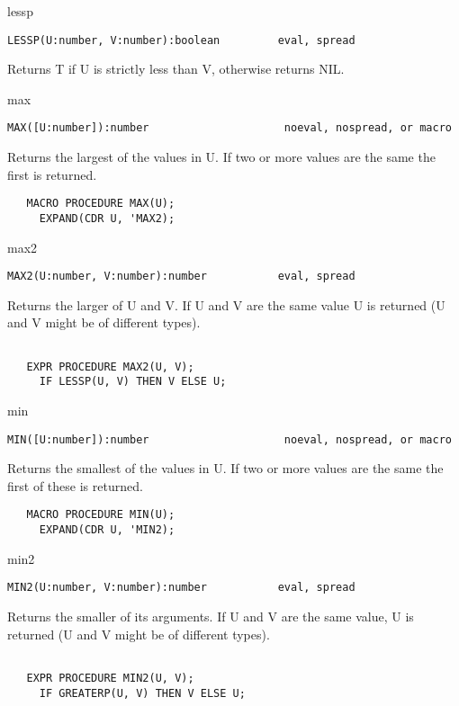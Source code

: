 \begin{Function}{lessp}
\begin{verbatim}
LESSP(U:number, V:number):boolean         eval, spread
\end{verbatim}
   Returns  T if  U is  strictly less  than V,  otherwise returns
   NIL.

\end{Function}
\begin{Function}{max}
\begin{verbatim}
MAX([U:number]):number                     noeval, nospread, or macro
\end{verbatim}
   Returns  the largest of the values in U. If two or more values
   are the same the first is returned.
\begin{verbatim}
   MACRO PROCEDURE MAX(U);
     EXPAND(CDR U, 'MAX2);
\end{verbatim}
\end{Function}
\begin{Function}{max2}
\begin{verbatim}
MAX2(U:number, V:number):number           eval, spread
\end{verbatim}
   Returns  the larger of U and V. If  U and V are the same value
   U is returned (U and V might be of different types).
\begin{verbatim}

   EXPR PROCEDURE MAX2(U, V);
     IF LESSP(U, V) THEN V ELSE U;
\end{verbatim}
\end{Function}
\begin{Function}{min}
\begin{verbatim}
MIN([U:number]):number                     noeval, nospread, or macro
\end{verbatim}
   Returns  the  smallest of  the  values in  U. If  two  or more
   values are the same the first of these is returned.
\begin{verbatim}
   MACRO PROCEDURE MIN(U);
     EXPAND(CDR U, 'MIN2);
\end{verbatim}

\end{Function}
\begin{Function}{min2}
\begin{verbatim}
MIN2(U:number, V:number):number           eval, spread
\end{verbatim}
   Returns  the smaller  of its arguments.   If  U and  V are the
   same  value,  U is  returned (U  and V  might be  of different
   types).
\begin{verbatim}

   EXPR PROCEDURE MIN2(U, V);
     IF GREATERP(U, V) THEN V ELSE U;
\end{verbatim}

\end{Function}
